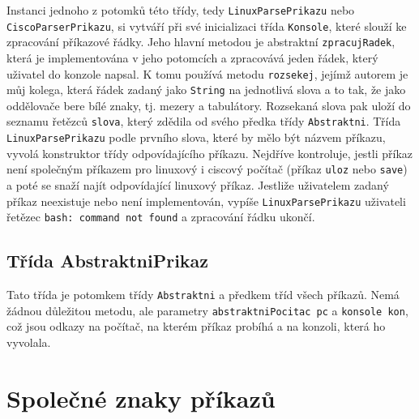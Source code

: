 Instanci jednoho z potomků této třídy, tedy \verb|LinuxParsePrikazu| nebo \verb|CiscoParserPrikazu|, si vytváří při své inicializaci třída \verb|Konsole|, které slouží ke zpracování příkazové řádky. Jeho hlavní metodou je abstraktní \verb|zpracujRadek|, která je implementována v jeho potomcích a zpracovává jeden řádek, který uživatel do konzole napsal. K tomu používá metodu \verb|rozsekej|, jejímž autorem je můj kolega, která řádek zadaný jako \verb|String|  na jednotlivá slova a to tak, že jako oddělovače bere bílé znaky, tj. mezery a tabulátory. Rozsekaná slova pak uloží do seznamu řetězců \verb|slova|, který zdědila od svého předka třídy \verb|Abstraktni|. Třída \verb|LinuxParsePrikazu| podle prvního slova, které by mělo být názvem příkazu, vyvolá konstruktor třídy odpovídajícího příkazu. Nejdříve kontroluje, jestli příkaz není společným příkazem pro linuxový i ciscový počítač (příkaz \verb|uloz| nebo \verb|save|) a poté se snaží najít odpovídající linuxový příkaz. Jestliže uživatelem zadaný příkaz neexistuje nebo není implementován, vypíše \verb|LinuxParsePrikazu| uživateli řetězec \verb|bash: command not found| a zpracování řádku ukončí.


\subsection{Třída AbstraktniPrikaz}

Tato třída je potomkem třídy \verb|Abstraktni| a předkem tříd všech příkazů. Nemá žádnou důležitou metodu, ale parametry \verb|abstraktniPocitac pc| a \verb|konsole kon|, což jsou odkazy na počítač, na kterém příkaz probíhá a na konzoli, která ho vyvolala.




\section{Společné znaky příkazů}

